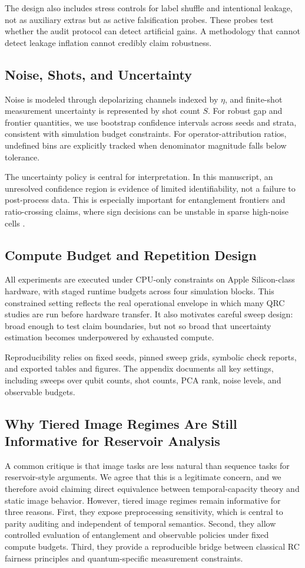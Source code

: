 \documentclass{article} %
\begin{document}
The design also includes stress controls for label shuffle and intentional leakage, not as auxiliary extras but as active falsification probes. These probes test whether the audit protocol can detect artificial gains. A methodology that cannot detect leakage inflation cannot credibly claim robustness.

\subsection{Noise, Shots, and Uncertainty}
Noise is modeled through depolarizing channels indexed by $\eta$, and finite-shot measurement uncertainty is represented by shot count $S$. For robust gap and frontier quantities, we use bootstrap confidence intervals across seeds and strata, consistent with simulation budget constraints. For operator-attribution ratios, undefined bins are explicitly tracked when denominator magnitude falls below tolerance.

The uncertainty policy is central for interpretation. In this manuscript, an unresolved confidence region is evidence of limited identifiability, not a failure to post-process data. This is especially important for entanglement frontiers and ratio-crossing claims, where sign decisions can be unstable in sparse high-noise cells \citep{arxiv_2509_06873,arxiv_2601_23084,arxiv_2602_00610}.

\subsection{Compute Budget and Repetition Design}
All experiments are executed under CPU-only constraints on Apple Silicon-class hardware, with staged runtime budgets across four simulation blocks. This constrained setting reflects the real operational envelope in which many QRC studies are run before hardware transfer. It also motivates careful sweep design: broad enough to test claim boundaries, but not so broad that uncertainty estimation becomes underpowered by exhausted compute.


Reproducibility relies on fixed seeds, pinned sweep grids, symbolic check reports, and exported tables and figures. The appendix documents all key settings, including sweeps over qubit counts, shot counts, PCA rank, noise levels, and observable budgets.

\subsection{Why Tiered Image Regimes Are Still Informative for Reservoir Analysis}
A common critique is that image tasks are less natural than sequence tasks for reservoir-style arguments. We agree that this is a legitimate concern, and we therefore avoid claiming direct equivalence between temporal-capacity theory and static image behavior. However, tiered image regimes remain informative for three reasons. First, they expose preprocessing sensitivity, which is central to parity auditing and independent of temporal semantics. Second, they allow controlled evaluation of entanglement and observable policies under fixed compute budgets. Third, they provide a reproducible bridge between classical RC fairness principles and quantum-specific measurement constraints.
\end{document}
